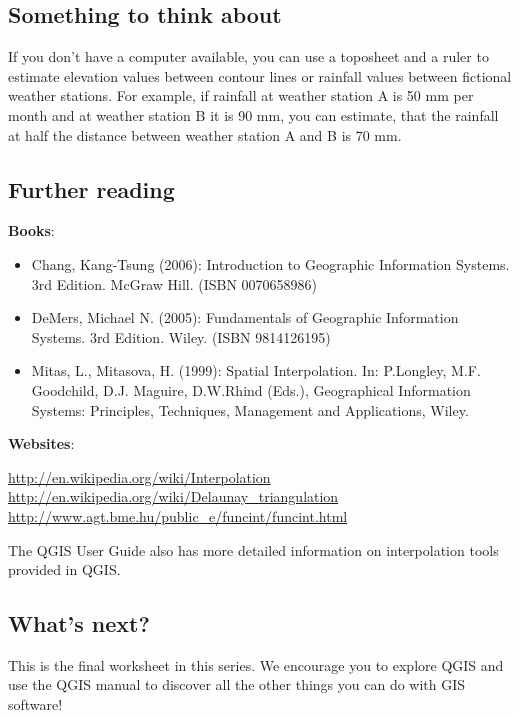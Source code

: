 \subsection{Something to think about}

If you don't have a computer available, you can use a toposheet and a ruler
to estimate elevation values between contour lines or rainfall values between
fictional weather stations. For example, if rainfall at weather station A is
50 mm per month and at weather station B it is 90 mm, you can estimate, that
the rainfall at half the distance between weather station A and B is 70 mm.

\subsection{Further reading}

\textbf{Books}: 

\begin{itemize}
\item Chang, Kang-Tsung (2006): Introduction to Geographic Information Systems. 3rd
Edition.  McGraw Hill. (ISBN 0070658986)
\item DeMers, Michael N. (2005): Fundamentals of Geographic Information Systems.
3rd Edition. Wiley. (ISBN 9814126195)
\item Mitas, L., Mitasova, H. (1999): Spatial Interpolation. In: P.Longley, M.F.
Goodchild, D.J. Maguire, D.W.Rhind (Eds.), Geographical Information Systems:
Principles, Techniques, Management and Applications, Wiley. 
\end{itemize}

\textbf{Websites}:
 
\url{http://en.wikipedia.org/wiki/Interpolation} \\
\url{http://en.wikipedia.org/wiki/Delaunay\_triangulation} \\
\url{http://www.agt.bme.hu/public_e/funcint/funcint.html}

The QGIS User Guide also has more detailed information on interpolation tools
provided in QGIS.

\subsection{What's next?}

This is the final worksheet in this series. We encourage you to explore QGIS
and use the QGIS manual to discover all the other things you can
do with GIS software!


